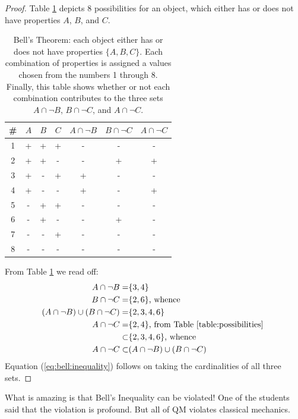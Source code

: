 \documentclass[]{article}
\begin{document}
\begin{proof}

    Table \ref{table:possibilities} depicts 8 possibilities for an object, which either has or does not have properties $A$, $B$, and $C$.
  
	\begin{table}[H]
		\caption[Bell's Theorem]{Bell's Theorem: each object either has or does not have properties $\{A, B,  C\}$. Each combination of properties is assigned a values chosen from the numbers 1 through 8. Finally, this table shows whether or not each combination contributes to the three sets $A \cap \neg B$, $B \cap \neg C$, and $A \cap \neg C $.}\label{table:possibilities}
		\begin{center}
			\begin{tabular}{|c|c|c|c|c|c|c|} \hline
				\#&$A$&$B$&$C$&$A \cap \neg B$&$B \cap \neg C$& $A \cap \neg C $\\ \hline
				\rowcolor{Gray}
				1&+&+&+&-&-&-  \\ \hline 
				2&+&+&-&-&+&+  \\ \hline
				3&+&-&+&+&-&-  \\ \hline 
				4&+&-&-&+&-&+  \\ \hline
				\rowcolor{Gray}
				5&-&+&+&-&-&-  \\ \hline 
				6&-&+&-&-&+&-  \\ \hline
				\rowcolor{Gray}
				7&-&-&+&-&-&-  \\ \hline
				\rowcolor{Gray} 
				8&-&-&-&-&-&- \\ \hline
			\end{tabular}
		\end{center}
	\end{table}

	From Table \ref{table:possibilities} we read off:
	\begin{align*}
		A \cap \neg B =& \{3, 4\} \\
		B \cap \neg C =& \{2, 6\} \text{, whence}\\
		(A \cap \neg B) \cup (B \cap \neg C) =&\{2,3,4, 6\}\\
		A \cap \neg C =& \{2,4\} \text{, from Table \ref{table:possibilities} }\\
		\subset& \{2,3,4, 6\} \text{, whence}\\
		A \cap \neg C \subset&(A \cap \neg B) \cup (B \cap \neg C)
	\end{align*}
Equation (\ref{eq:bell:inequality}) follows on taking the cardinalities of all three sets.
\end{proof}
What is amazing is that Bell's Inequality can be violated! One of the students said that the violation is profound. But all of QM violates classical mechanics. 
\end{document}
